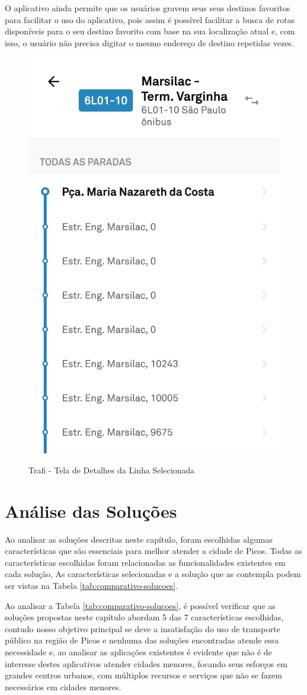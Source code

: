 O aplicativo ainda permite que os usuários gravem seus seus destinos favoritos para facilitar o uso do aplicativo, pois assim é possível facilitar a busca de rotas disponíveis para o seu destino favorito com base na sua localização atual e, com isso, o usuário não precisa digitar o mesmo endereço de destino repetidas vezes.


\begin{figure}[H]
\caption{Trafi - Tela de Detalhes da Linha Selecionada}
\centering
\includegraphics[width=.4\textwidth]{imagens/traffi.png}
\label{fig:trafi}
\end{figure}

\section{Análise das Soluções}

Ao analisar as soluções descritas neste capítulo, foram escolhidas algumas características que são essenciais para melhor atender a cidade de Picos. Todas as características escolhidas foram relacionadas as funcionalidades existentes em cada solução, As características selecionadas e a solução que as contempla podem ser vistas na Tabela \ref{tab:comparativo-solucoes}.

Ao analisar a Tabela \ref{tab:comparativo-solucoes}, é possível verificar que as soluções propostas neste capítulo abordam 5 das 7 características escolhidas, contudo nosso objetivo principal se deve a insatisfação do uso de transporte público na região de Picos e nenhuma das soluções encontradas atende essa necessidade e, ao analisar as aplicações existentes é evidente que não é de interesse destes aplicativos atender cidades menores, focando seus esforços em grandes centros urbanos, com múltiplos recursos e serviços que não se fazem necessários em cidades menores.


